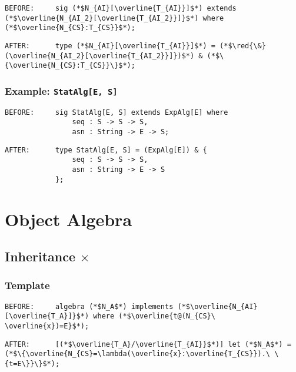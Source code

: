 \documentclass{article}
\newcommand{\red}[1]{\textcolor{red}{#1}}
\begin{document}
\begin{spacing}{1.1}
\begin{lstlisting}[numbers=none]
BEFORE:     sig (*$N_{AI}[\overline{T_{AI}}]$*) extends (*$\overline{N_{AI_2}[\overline{T_{AI_2}}]}$*) where (*$\overline{N_{CS}:T_{CS}}$*);
\end{lstlisting}
\begin{lstlisting}[numbers=none]
AFTER:      type (*$N_{AI}[\overline{T_{AI}}]$*) = (*$\red{\&}(\overline{N_{AI_2}[\overline{T_{AI_2}}]})$*) & (*$\{\overline{N_{CS}:T_{CS}}\}$*);
\end{lstlisting}

\subsubsection{Example: \lstinline{StatAlg[E, S]}}

\begin{lstlisting}[numbers=none]
BEFORE:     sig StatAlg[E, S] extends ExpAlg[E] where
                seq : S -> S -> S,
                asn : String -> E -> S;
\end{lstlisting}
\begin{lstlisting}[numbers=none]
AFTER:      type StatAlg[E, S] = (ExpAlg[E]) & {
                seq : S -> S -> S,
                asn : String -> E -> S
            };
\end{lstlisting}

\section{Object Algebra}

\subsection{Inheritance $\times$}

\subsubsection{Template}

\begin{lstlisting}[numbers=none]
BEFORE:     algebra (*$N_A$*) implements (*$\overline{N_{AI}[\overline{T_A}]}$*) where (*$\overline{t@(N_{CS}\ \overline{x})=E}$*);
\end{lstlisting}
\begin{lstlisting}[numbers=none]
AFTER:      [(*$\overline{T_A}/\overline{T_{AI}}$*)] let (*$N_A$*) = (*$\{\overline{N_{CS}=\lambda(\overline{x}:\overline{T_{CS}}).\ \{t=E\}}\}$*);
\end{lstlisting}


\end{spacing}
\end{document}
